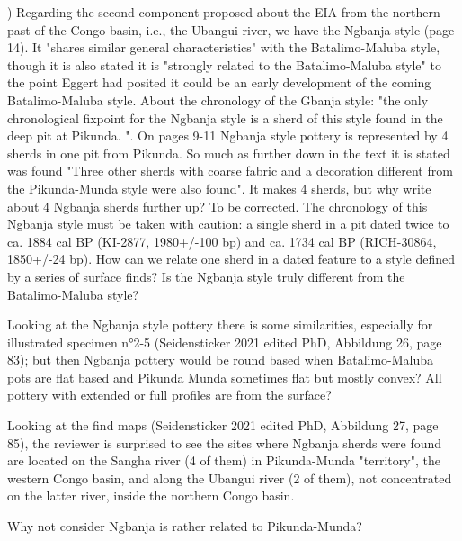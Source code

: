 \begin{reviewer}
) Regarding the second component proposed about the EIA from the northern past of the Congo basin, i.e., the Ubangui river, we have the Ngbanja style (page 14). It "shares similar general characteristics" with the Batalimo-Maluba style, though it is also stated it is "strongly related to the Batalimo-Maluba style" to the point Eggert had posited it could be an early development of the coming Batalimo-Maluba style.
About the chronology of the Gbanja style: "the only chronological fixpoint for the Ngbanja style is a sherd of this style found in the deep pit at Pikunda. ". On pages 9-11 Ngbanja style pottery is represented by 4 sherds in one pit from Pikunda. So much as further down in the text it is stated was found "Three other sherds with coarse fabric and a decoration different from the Pikunda-Munda style were also found". It makes 4 sherds, but why write about 4 Ngbanja sherds further up? To be corrected.
The chronology of this Ngbanja style must be taken with caution: a single sherd in a pit dated twice to ca. 1884 cal BP (KI-2877, 1980+/-100 bp) and ca. 1734 cal BP (RICH-30864, 1850+/-24 bp).
How can we relate one sherd in a dated feature to a style defined by a series of surface finds?
Is the Ngbanja style truly different from the Batalimo-Maluba style?

Looking at the Ngbanja style pottery there is some similarities, especially for illustrated specimen n°2-5 (Seidensticker 2021 edited PhD, Abbildung 26, page 83); but then Ngbanja pottery would be round based when Batalimo-Maluba pots are flat based and Pikunda Munda sometimes flat but mostly convex? All pottery with extended or full profiles are from the surface?

Looking at the find maps (Seidensticker 2021 edited PhD, Abbildung 27, page 85), the reviewer is surprised to see the sites where Ngbanja sherds were found are located on the Sangha river (4 of them) in Pikunda-Munda "territory", the western Congo basin, and along the Ubangui river (2 of them), not concentrated on the latter river, inside the northern Congo basin.

Why not consider Ngbanja is rather related to Pikunda-Munda?


\end{reviewer}
